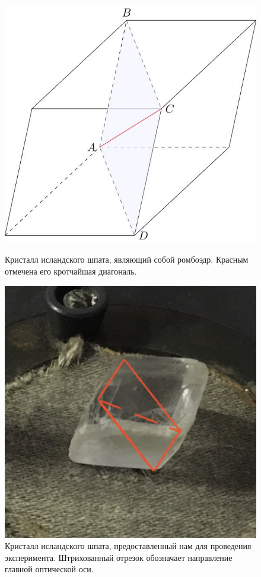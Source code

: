 \documentclass[12pt]{article}
\begin{document}
	\begin{figure}[tb]
	  	\begin{center}
		\begin{minipage}[h]{0.45\linewidth}
		\includegraphics[width=1\linewidth]{../data/k}
		\caption{Кристалл исландского шпата, являющий собой ромбоэдр. Красным отмечена его кротчайшая диагональ.} 
		\label{fig:1}
		\end{minipage}
		\hfill
		\begin{minipage}[h]{0.45\linewidth}
		\includegraphics[width=1\linewidth]{../data/opt_ax}
		\caption{Кристалл исландского шпата, предоставленный нам для проведения эксперимента. Штрихованный отрезок обозначает направление главной оптической оси.}
		\label{fig:2}
		\end{minipage}
		\end{center}
	\end{figure}
\end{document}
